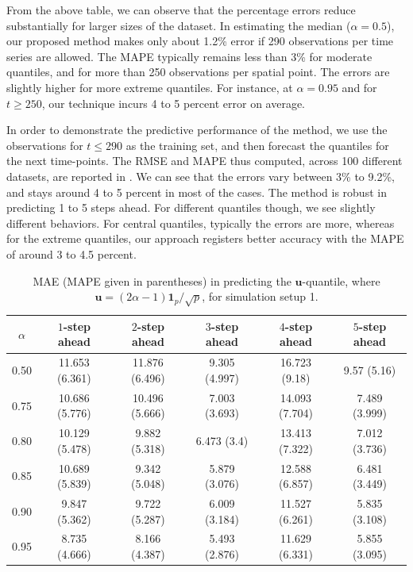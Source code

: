 \documentclass[aos]{imsart}
\theoremstyle{plain}
\theoremstyle{remark}
\newcommand{\bb}[1]{\boldsymbol{#1}}
\begin{document}
From the above table, we can observe that the percentage errors reduce substantially for larger sizes of the dataset. In estimating the median ($\alpha=0.5$), our proposed method makes only about 1.2\% error if 290 observations per time series are allowed. The MAPE typically remains less than 3\% for moderate quantiles, and for more than 250 observations per spatial point. The errors are slightly higher for more extreme quantiles. For instance, at $\alpha=0.95$ and for $t\geqslant 250$, our technique incurs 4 to 5 percent error on average. 

In order to demonstrate the predictive performance of the method, we use the observations for $t\leqslant 290$ as the training set, and then forecast the quantiles for the next time-points. The RMSE and MAPE thus computed, across 100 different datasets, are reported in . We can see that the errors vary between 3\% to 9.2\%, and stays around 4 to 5 percent in most of the cases. The method is robust in predicting 1 to 5 steps ahead. For different quantiles though, we see slightly different behaviors. For central quantiles, typically the errors are more, whereas for the extreme quantiles, our approach registers better accuracy with the MAPE of around 3 to 4.5 percent.

\begin{table}[ht]
\centering
\caption{MAE (MAPE given in parentheses) in predicting the $\bb{u}$-quantile, where $\bb{u}=(2\alpha - 1)\bb{1}_p/\sqrt{p}$, for simulation setup 1.}
\label{tab:sim-S1-pred-RMSE}
\begin{tabular}{cccccc}
  \toprule
   $\alpha$ & $1$-step ahead & $2$-step ahead & $3$-step ahead & $4$-step ahead & $5$-step ahead \\ 
  \midrule
   0.50 & 11.653 (6.361) & 11.876 (6.496) & 9.305 (4.997) & 16.723 (9.18) & 9.57 (5.16) \\ 
   0.75 & 10.686 (5.776) & 10.496 (5.666) & 7.003 (3.693) & 14.093 (7.704) & 7.489 (3.999) \\ 
   0.80 & 10.129 (5.478) & 9.882 (5.318) & 6.473 (3.4) & 13.413 (7.322) & 7.012 (3.736) \\ 
   0.85 & 10.689 (5.839) & 9.342 (5.048) & 5.879 (3.076) & 12.588 (6.857) & 6.481 (3.449) \\ 
   0.90 & 9.847 (5.362) & 9.722 (5.287) & 6.009 (3.184) & 11.527 (6.261) & 5.835 (3.108) \\ 
   0.95 & 8.735 (4.666) & 8.166 (4.387) & 5.493 (2.876) & 11.629 (6.331) & 5.855 (3.095) \\ 
   \bottomrule
\end{tabular}
\end{table}
\end{document}
